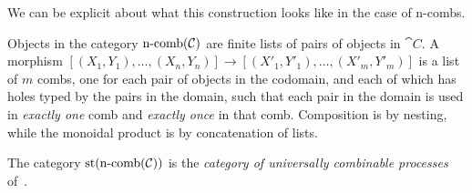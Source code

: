 We can be explicit about what this construction looks like in the case of
n-combs.

\begin{dfn}
  Objects in the category $\operatorname*{n-comb}({\mathcal{C}})$ are finite lists of pairs of objects
  in $\cat{C}$. A morphism $[(X_1, Y_1), \ldots, (X_n, Y_n)]\to [(X'_1, Y'_1),
  \dots, (X'_m, Y'_m)]$ is a list of $m$ combs, one for each pair of objects in
  the codomain, and each of which has holes typed by the pairs in the domain,
  such that each pair in the domain is used in \emph{exactly one} comb and
  \emph{exactly once} in that comb. Composition is by nesting, while the
  monoidal product is by concatenation of lists.
\end{dfn}

\begin{ex}
  The category $\operatorname*{st}(\operatorname*{n-comb}({\mathcal{C}}))$ is the \emph{category of universally
  combinable processes} of~\cite{coecke-2016}.
\end{ex}

